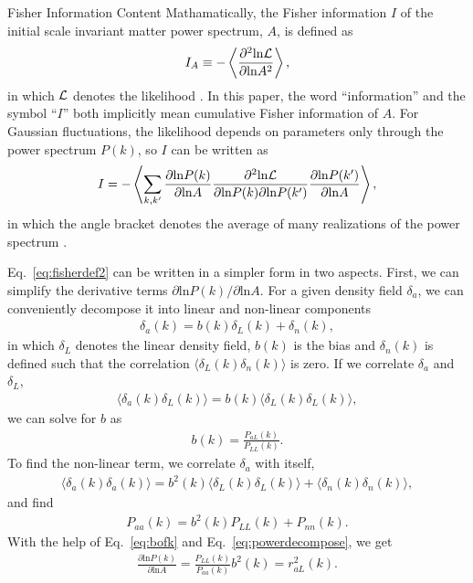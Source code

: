 \begin{section}{Fisher Information Content}
  \label{sec:fisherinfo}
  Mathamatically, the Fisher information $I$ of the initial scale
  invariant matter power spectrum, $A$, is defined as
  \begin{align}
    I_A \equiv -\left\langle \frac{\partial ^2 \mathrm{ln \mathcal{L}}}{\partial  \mathrm{ln} A ^2}\right\rangle,
    \label{eq:fisherdefine}
  \end{align}
  in which $\mathcal{L}$ denotes the likelihood \cite{bib:Tegmark1997}.  
  In this paper, the word \enquote{information} and the symbol \enquote{$I$} both implicitly 
  mean cumulative Fisher information 
  of $A$. For Gaussian
  fluctuations, the likelihood depends on parameters only through the
  power spectrum $P(k)$, so $I$ can be written as 
  \begin{align}
    I = - \left\langle \sum_{k,k'} \frac{\partial \mathrm{ln} P(k)}{\partial \mathrm{ln} A} 
    \frac{\partial ^2 \mathrm{ln \mathcal{L}}}{\partial \mathrm{ln} P(k) \partial \mathrm{ln} P(k')}
    \frac{\partial \mathrm{ln} P(k')}{\partial \mathrm{ln} A}\right\rangle,
    \label{eq:fisherdef2}
  \end{align}
  in which the angle bracket denotes the average of many realizations
  of the power spectrum \cite{bib:Rimes2006}.

  Eq.~\ref{eq:fisherdef2} can be written in a simpler
  form in two aspects.   First, we can simplify the derivative terms
  $\partial \mathrm{ln} P(k)/\partial\mathrm{ln} A$.  For a given density field $\delta_a$, we can
  conveniently decompose it into linear and non-linear components
  \begin{align}
    \delta_a(k) = b (k) \delta _L (k) + \delta_{n}(k),
    \label{eq:decompose}
  \end{align}
  in which $\delta_L$ denotes the linear density field, $b(k)$ is the
  bias and $\delta_{n}(k)$ is defined such that the correlation
  $\langle \delta_L(k)\delta_{n}(k) \rangle$ is zero.  If we correlate
  $\delta_a$ and $\delta_L$,
  \begin{align}
    \langle \delta_a(k)\delta_L(k) \rangle = b(k) \langle \delta_L(k)\delta_L(k) \rangle,
    \label{eq:correlating}
  \end{align} 
  we can solve for $b$ as
  \begin{align}
    b (k) = \frac{P _{aL}(k)}{P_{LL}(k)}.
    \label{eq:bofk}
  \end{align}
  To find the non-linear term, we correlate $\delta_a$ with itself,
  \begin{align}
    \langle \delta_a(k) \delta_a(k) \rangle = 
    b^2(k) \langle \delta_L(k) \delta_L(k) \rangle + \langle \delta_{n}(k)\delta_{n}(k) \rangle,
  \end{align}
  and find
  \begin{align}
    P_{aa}(k) = b^2(k) P_{LL}(k) + P_{nn}(k).
    \label{eq:powerdecompose}
  \end{align}
  With the help of Eq.~\ref{eq:bofk} and Eq.~\ref{eq:powerdecompose},
  we get
  \begin{align}
    \frac{\partial \mathrm{ln} P(k) }{ \partial \mathrm{ln} A}=
    \frac{P_{LL}(k)}{P_{aa}(k)}b^2(k)=r^2_{aL}(k).
  \end{align}


\end{section}
